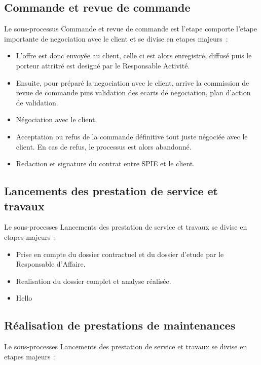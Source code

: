 \subsection{Commande et revue de commande}

Le sous-processus Commande et revue de commande est l'etape comporte l'etape importante de negociation
avec le client et se divise en etapes majeurs~:

\begin{itemize}
    \item L'offre est donc envoy\'ee au client, celle ci est alors enregistr\'e, diffus\'e puis le
    porteur attritr\'e est design\'e par le Responsable Activit\'e.
    \item Ensuite, pour pr\'epar\'e la negociation avec le client, arrive la commission de revue de
    commande puis validation des ecarts de negociation, plan d'action de validation.
    \item N\'egociation avec le client.
    \item Acceptation ou refus de la commande d\'efinitive tout juste n\'egoci\'ee avec le client.
    En cas de refus, le processus est alors abandonn\'e.
    \item Redaction et signature du contrat entre SPIE et le client.
\end{itemize}

\subsection{Lancements des prestation de service et travaux}

Le sous-processes Lancements des prestation de service et travaux se divise en etapes majeurs~:

\begin{itemize}
    \item Prise en compte du dossier contractuel et du dossier d'etude par le Responsable d'Affaire.
    \item Realisation du dossier complet et analyse r\'ealis\'ee.
    \item Hello
\end{itemize}

\subsection{R\'ealisation de prestations de maintenances}

Le sous-processes Lancements des prestation de service et travaux se divise en etapes majeurs~:

